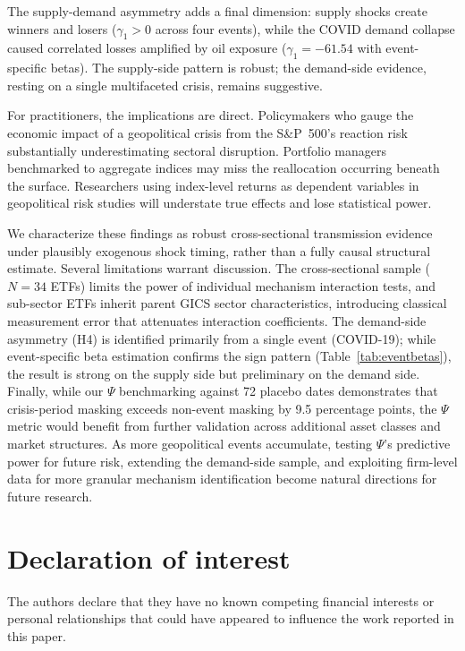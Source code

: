 \documentclass[12pt,preprint,authoryear]{elsarticle}
\begin{document}
The supply-demand asymmetry adds a final dimension: supply shocks create winners and losers ($\gamma_1 > 0$ across four events), while the COVID demand collapse caused correlated losses amplified by oil exposure ($\gamma_1 = -61.54$ with event-specific betas). The supply-side pattern is robust; the demand-side evidence, resting on a single multifaceted crisis, remains suggestive.

For practitioners, the implications are direct. Policymakers who gauge the economic impact of a geopolitical crisis from the S\&P~500's reaction risk substantially underestimating sectoral disruption. Portfolio managers benchmarked to aggregate indices may miss the reallocation occurring beneath the surface. Researchers using index-level returns as dependent variables in geopolitical risk studies will understate true effects and lose statistical power.

We characterize these findings as robust cross-sectional transmission evidence under plausibly exogenous shock timing, rather than a fully causal structural estimate. Several limitations warrant discussion. The cross-sectional sample ($N = 34$ ETFs) limits the power of individual mechanism interaction tests, and sub-sector ETFs inherit parent GICS sector characteristics, introducing classical measurement error that attenuates interaction coefficients. The demand-side asymmetry (H4) is identified primarily from a single event (COVID-19); while event-specific beta estimation confirms the sign pattern (Table~\ref{tab:eventbetas}), the result is strong on the supply side but preliminary on the demand side. Finally, while our $\Psi$ benchmarking against 72 placebo dates demonstrates that crisis-period masking exceeds non-event masking by 9.5 percentage points, the $\Psi$ metric would benefit from further validation across additional asset classes and market structures. As more geopolitical events accumulate, testing $\Psi$'s predictive power for future risk, extending the demand-side sample, and exploiting firm-level data for more granular mechanism identification become natural directions for future research.

\section*{Declaration of interest}
The authors declare that they have no known competing financial interests or personal relationships that could have appeared to influence the work reported in this paper.
\end{document}
